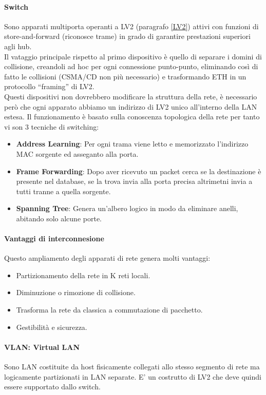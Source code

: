 \documentclass[12pt]{article}
\begin{document}
\paragraph{Switch}
Sono apparati multiporta operanti a LV2 (paragrafo \ref{LV2}) attivi con funzioni di store-and-forward (riconosce trame) in grado di garantire prestazioni superiori agli hub.\\
Il vataggio principale rispetto al primo dispositivo è quello di separare i domini di collisione, creandoli ad hoc per ogni connessione punto-punto, eliminando così di fatto le collisioni (CSMA/CD non più necessario) e trasformando ETH in un protocollo ``framing'' di LV2.\\
Questi dispositivi non dovrebbero modificare la struttura della rete, è necessario però che ogni apparato abbiamo un indirizzo di LV2 unico all'interno della LAN estesa. Il funzionamento è basato sulla conoscenza topologica della rete per tanto vi son 3 tecniche di switching:
\begin{itemize}
  \item \textbf{Address Learning}: Per ogni trama viene letto e memorizzato l'indirizzo MAC sorgente ed asseganto alla porta.
  \item \textbf{Frame Forwarding}: Dopo aver ricevuto un packet cerca se la destinazione è presente nel database, se la trova invia alla porta precisa altrimetni invia a tutti tranne a quella sorgente.
  \item \textbf{Spanning Tree}: Genera un'albero logico in modo da eliminare anelli, abitando solo alcune porte.
\end{itemize}
\paragraph{Vantaggi di interconnesione}
Questo ampliamento degli apparati di rete genera molti vantaggi:
\begin{itemize}
  \item Partizionamento della rete in K reti locali.
  \item Diminuzione o rimozione di collisione.
  \item Trasforma la rete da classica a commutazione di pacchetto.
  \item Gestibilità e sicurezza.
\end{itemize}
\paragraph{VLAN: Virtual LAN}
Sono LAN costituite da host fisicamente collegati allo stesso segmento di rete ma logicamente partizionati in LAN separate. E' un costrutto di LV2 che deve quindi essere supportato dallo switch.
\end{document}
